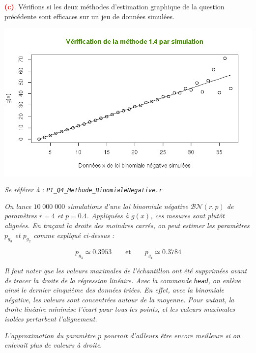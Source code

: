 \documentclass[a4paper,11pt]{article}
\theoremstyle{nonumberplain}
\theoremstyle{nonumberplain}
\theoremstyle{nonumberplain}
\theoremstyle{nonumberplain}
\begin{document}
      \bigskip
      \textbf{\textcolor{red}{(c)}}. Vérifions si les deux méthodes d'estimation graphique
      de la question précédente sont efficaces sur un jeu de données simulées.

      \begin{center}
          \includegraphics[scale=0.75]{images/p1_q4_verif.png}
      \end{center}

      \begin{ref_r}
          \emph{Se référer à :} \texttt{\emph{P1\_Q4\_Methode\_BinomialeNegative.r}}
      \end{ref_r}

      \vspace{-1ex}
      \begin{commentaire}
          \hspace{-1ex}\emph{On lance $10\;000 \;000$ simulations d'une loi binomiale
          négative $\mathcal{BN}(r, p)$ de paramètres $r = 4$ et $p = 0.4$. Appliquées à $g(x)$, ces
          mesures sont plutôt alignées. En traçant la droite des moindres
          carrés, on peut estimer les paramètres $p_{g_3}$ et $p_{g_2}$ comme expliqué ci-dessus :}

          \[
                p_{g_3} \simeq 0.3953\qquad\text{et}\qquad p_{g_4} \simeq 0.3784
          \]

          \medskip
          \emph{Il faut noter que les valeurs maximales de l'échantillon ont été supprimées avant de tracer la droite
          de la régression linéaire. Avec la commande \texttt{head}, on enlève ainsi le dernier cinquième des données triées.
          En effet, avec la binomiale négative, les valeurs sont concentrées autour de la moyenne. Pour autant, la droite linéaire minimise
          l'écart pour tous les points, et les valeurs maximales isolées perturbent l'alignement.}

          \medskip
          \emph{L'approximation du paramètre $p$ pourrait d'ailleurs être encore meilleure si on enlevait plus de valeurs à droite}.
      \end{commentaire}
\end{document}

